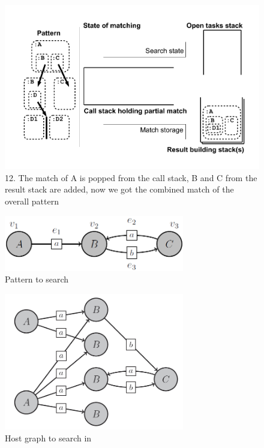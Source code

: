 \begin{figure}[htbp]
  \centering
  \includegraphics[width=\textwidth]{fig/Passungszustand12}
  \caption{12. The match of A is popped from the call stack, B and C from the result stack are added, now we got the combined match of the overall pattern}
  \label{figmatchingstate12}
\end{figure}


\begin{figure}[htbp]
  \centering
  \includegraphics[width=0.7\textwidth]{fig/Pattern}
  \caption{Pattern to search}
  \label{figpatterntosearch}
\end{figure}

\begin{figure}[htbp]
  \centering
  \includegraphics[width=0.7\textwidth]{fig/Graph}
  \caption{Host graph to search in}
  \label{figgraphtosearchin}
\end{figure}


